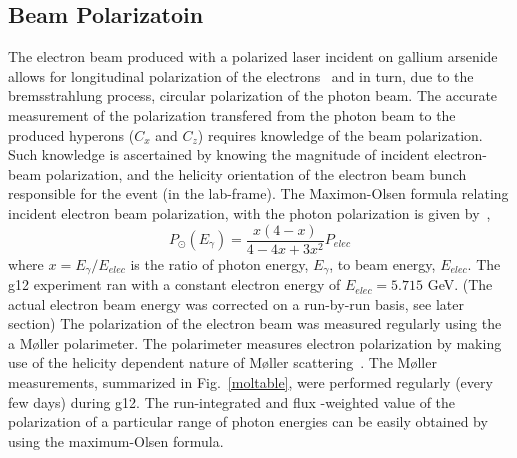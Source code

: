 \subsection{\label{sec:calib.pol}Beam Polarizatoin}
The electron beam produced with a polarized laser incident on gallium arsenide allows for longitudinal polarization of the electrons~\cite{polarizedelectrons} and in turn, due to the bremsstrahlung process, circular polarization of the photon beam.  The accurate measurement of the polarization transfered from the photon beam to the produced hyperons ($C_x$ and $C_z$) requires knowledge of the beam polarization.  Such knowledge is ascertained by knowing the magnitude of incident electron-beam polarization, and the helicity orientation of the electron beam bunch responsible for the event (in the lab-frame). The Maximon-Olsen formula relating incident electron beam polarization, with the photon polarization is given by~\cite{MaximonOlsen},
\begin{equation}
P_\odot(E_\gamma) = \frac{x(4-x)}{4 - 4x + 3x^2}P_{elec}
\end{equation}
where $x = E_\gamma /E_{elec}$ is the ratio of photon energy, $E_\gamma$, to beam energy, $E_{elec}$. The g12 experiment ran with a constant electron energy of $E_{elec} = 5.715$ GeV.  (The actual electron beam energy was corrected on a run-by-run basis, see later section) The polarization of the electron beam was measured regularly using the a M{\o}ller polarimeter.  The polarimeter measures electron polarization by making use of the helicity dependent nature of M{\o}ller scattering~\cite{Mecking,Carman}. The M{\o}ller measurements, summarized in Fig.~\ref{moltable}, were performed regularly (every few days) during g12.  The run-integrated and flux -weighted value of the polarization of a particular range of photon energies can be easily obtained by using the maximum-Olsen formula. 

